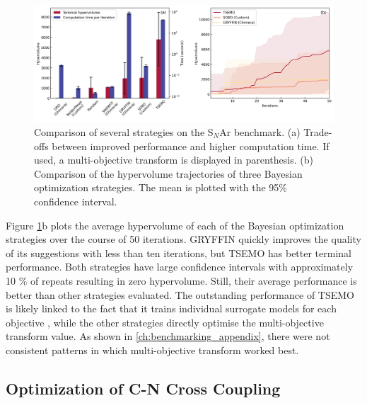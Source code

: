 \begin{figure}
    \centering
    \includegraphics[width=1.2\textwidth]{gfx/Chapter03/snar_hv_time_tradeoff.png}
    \caption{Comparison of several strategies on the S$_N$Ar benchmark. (a) Trade-offs between improved performance and higher computation time. If used, a multi-objective transform is displayed in parenthesis. (b) Comparison of the hypervolume trajectories of three Bayesian optimization strategies. The mean is plotted with the 95\% confidence interval.}
    \label{fig:hv_time_tradeoff}
\end{figure}

Figure \ref{fig:hv_time_tradeoff}b plots the average hypervolume of each of the Bayesian optimization strategies over the course of 50 iterations. GRYFFIN quickly improves the quality of its suggestions with less than ten iterations, but TSEMO has better terminal performance. Both strategies have large confidence intervals with approximately 10 \% of repeats resulting in zero hypervolume. Still, their average performance is better than other strategies evaluated. The outstanding performance of TSEMO is likely linked to the fact that it trains individual surrogate models for each objective \cite{Bradford2018}, while the other strategies directly optimise the multi-objective transform value. As shown in \ref{ch:benchmarking_appendix}, there were not consistent patterns in which multi-objective transform worked best.

\subsection{Optimization of C-N Cross Coupling}

